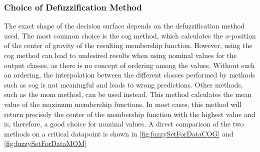 \subsubsection{Choice of Defuzzification Method}

The exact shape of the decision surface depends on the defuzzification method used. The most common choice is the \gls{cog} method, which calculates the $x$-position of the center of gravity of the resulting membership function.
However, using the \gls{cog} method can lead to undesired results when using nominal  values for the output classes, as there is no concept of ordering among the values.
Without such an ordering, the interpolation between the different classes performed by methods such as \gls{cog} is not meaningful and leads to wrong predictions. Other methods, such as the \gls{mom} method, can be used instead. This method calculates the mean value of the maximum membership functions. In most cases, this method will return precisely the center of the membership function with the highest value and is, therefore, a good choice for nominal values. A direct comparison of the two methods on a critical datapoint is shown in \autoref{fig:fuzzySetForDataCOG} and \autoref{fig:fuzzySetForDataMOM}


